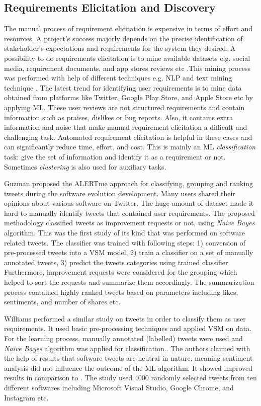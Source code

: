 \subsection{Requirements Elicitation and Discovery}

The manual process of requirement elicitation is expensive in terms of
effort and resources. A project's success majorly depends
on the precise identification of stakeholder's expectations and requirements for
the system they desired.
A possibility to do requirements elicitation is to mine available datasets e.g.
social media, requirement documents, and app stores reviews etc .This mining process was performed with help of different techniques e.g. NLP and text mining technique \cite{Hollis2017}\cite{dong2010}. The latest trend for
identifying user requirements is to mine data obtained from platforms like Twitter,
Google Play Store, and Apple Store etc by applying ML. These user reviews are not structured requirements
and contain information such as praises, dislikes or bug reports. Also, it contains extra information and noise that make manual requirement elicitation a difficult and challenging task.
Automated requirement elicitation is helpful in these cases and can
significantly reduce time, effort, and cost. This is mainly an ML
\emph{classification} task: give the set of information and identify it as a
requirement or not. Sometimes \emph{clustering} is also used for auxiliary
tasks.

	Guzman \etal \cite{Guzman:2017} proposed the ALERTme approach for
classifying, grouping and ranking tweets during the software
evolution development. Many users shared their opinions about various software on Twitter. The huge amount of dataset made it hard to manually identify tweets that contained user requirements. The proposed methodology classified tweets as improvement requests or not, using \emph{Naive Bayes} algorithm. This was the first study of
its kind that was performed on software related tweets. 
The classifier was trained with following steps: 1) conversion of
pre-processed tweets into a VSM model, 2) train a classifier
on a set of manually annotated tweets, 3) predict the tweets categories using trained classifier. Furthermore, improvement
requests were considered for the grouping which helped to sort the
requests and summarize them accordingly. The summarization process contained highly ranked tweets based on parameters including likes, sentiments, and number of shares etc.

	Williams \etal \cite{Williams:2017} performed a similar study on tweets in order
to classify them as user requirements. It used basic pre-processing techniques and applied VSM on data. For the learning
process, manually annotated (labelled) tweets were used and \emph{Naive Bayes} algorithm was applied for classification.. The authors claimed with the help of results that
software tweets are neutral in nature, meaning sentiment analysis did not
influence the outcome of the ML algorithm. It showed improved results in comparison to \cite{Guzman:2017}.
The study used 4000 randomly selected tweets from ten different
softwares including Microsoft Visual Studio, Google Chrome, and Instagram etc.

